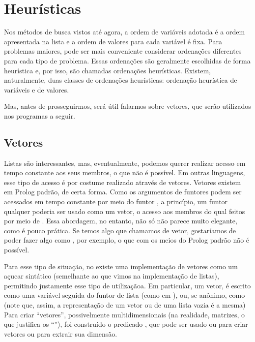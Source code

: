 \documentclass{article}
\begin{document}
\section{Heurísticas}

Nos métodos de busca vistos até agora, a ordem de variáveis adotada é a ordem apresentada na lista
e a ordem de valores para cada variável é fixa. Para problemas maiores, pode ser mais conveniente
considerar ordenações diferentes para cada tipo de problema. Essas ordenações são geralmente
escolhidas de forma heurística e, por isso, são chamadas ordenações heurísticas. Existem,
naturalmente, duas classes de ordenações heurísticas: ordenação heurística de variáveis e de
valores.

Mas, antes de prosseguirmos, será útil falarmos sobre vetores, que serão utilizados nos programas a
seguir.

\subsection{Vetores}

Listas são interessantes, mas, eventualmente, podemos querer realizar acesso em tempo constante aos
seus membros, o que não é possível. Em outras linguagens, esse tipo de acesso é por costume
realizado através de vetores. Vetores existem em Prolog padrão, de certa forma. Como os argumentos
de funtores podem ser acessados em tempo constante por meio do funtor , a princípio,
um funtor qualquer poderia ser usado como um vetor, o acesso aos membros do qual feitos por meio de
. Essa abordagem, no entanto, não só não parece muito elegante, como é pouco prática.
Se temos algo que chamamos de vetor, gostaríamos de poder fazer algo como , por
exemplo, o que com os meios do Prolog padrão não é possível.

Para esse tipo de situação, no \eclipse existe uma implementação de vetores como um açucar
sintático (semelhante ao que vimos na implementação de listas), permitindo justamente esse tipo de
utilizaçãoa. Em particular, um vetor, é escrito como uma variável seguida do funtor de lista (como
em ), ou, se anônimo, como  (note que, assim, a representação de
um vetor ou de uma lista vazia é a mesma) Para criar ``vetores'', possivelmente multidimensionais
(na realidade, matrizes, o que justifica os ``''), foi construído o predicado , que
pode ser usado ou para criar vetores ou para extrair sua dimensão.
\end{document}
